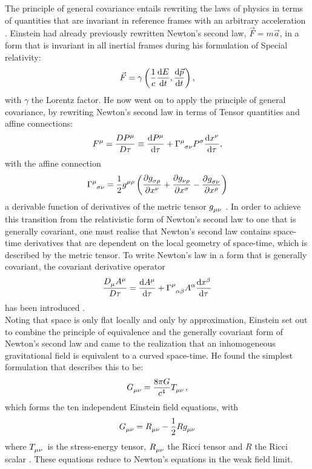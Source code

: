 \documentclass[a4paper, 11pt]{FSKH_623_Report}
\numberwithin{equation}{section}
\begin{document}
The principle of general covariance entails rewriting the laws of physics in terms of quantities that are invariant in reference frames with an arbitrary acceleration \citep{ITC}. Einstein had already previously rewritten Newton's second law, $\vec{F}=m\vec{a}$, in a form that is invariant in all inertial frames during his formulation of Special relativity: $$\vec{F}=\gamma\left(\frac{1}{c}\dv{E}{t},\dv{\vec{p}}{t}\right),$$with $\gamma$ the Lorentz factor. He now went on to apply the principle of general covariance, by rewriting Newton's second law in terms of Tensor quantities and affine connections: $$\tensor{F}{^\mu}=\frac{D\tensor{P}{^\mu}}{D\tau}\equiv\dv{\tensor{P}{^\mu}}{\tau}+\tensor{\Gamma}{^\mu_{\sigma\nu}}\tensor{P}{^\sigma}\dv{\tensor{x}{^\nu}}{\tau},$$ with the affine connection $$\tensor{\Gamma}{^\mu_{\sigma\nu}}=\frac{1}{2}\tensor{g}{^{\mu\rho}}\left(\pdv{\tensor{g}{_{\sigma\rho}}}{x^\nu}+\pdv{\tensor{g}{_{\nu\rho}}}{x^\sigma}-\pdv{\tensor{g}{_{\sigma\nu}}}{x^\rho}\right)$$ a derivable function of derivatives of the metric tensor $\tensor{g}{_{\mu\nu}}$ \citep{ITC}. In order to achieve this transition from the relativistic form of Newton's second law to one that is generally covariant, one must realise that Newton's second law contains space-time derivatives that are dependent on the local geometry of space-time, which is described by the metric tensor. To write Newton's law in a form that is generally covariant, the covariant derivative operator $$\frac{\tensor{D}{_\mu}\tensor{A}{^\mu}}{D\tau}=\dv{\tensor{A}{^\mu}}{\tau}+\tensor{\Gamma}{^\mu_{\alpha\beta}}\tensor{A}{^\alpha}\dv{\tensor{x}{^{\beta}}}{\tau}$$ has been introduced \citep{GRFD}. \\ 
Noting that space is only flat locally and only by approximation, Einstein set out to combine the principle of equivalence and the generally covariant form of Newton's second law and came to the realization that an inhomogeneous gravitational field is equivalent to a curved space-time. He found the simplest formulation that describes this to be:
$$\tensor{G}{_{\mu\nu}}=\frac{8\pi G}{c^{4}}\tensor{T}{_{\mu\nu}},$$
which forms the ten independent Einstein field equations, with 
$$\tensor{G}{_{\mu\nu}}=\tensor{R}{_{\mu\nu}}-\frac{1}{2}R\tensor{g}{_{\mu\nu}}$$ where $\tensor{T}{_{\mu\nu}}$ is the stress-energy tensor, $\tensor{R}{_{\mu\nu}}$ the Ricci tensor and $R$ the Ricci scalar \citep{ITC}. These equations reduce to Newton's equations in the weak field limit.
\end{document}
